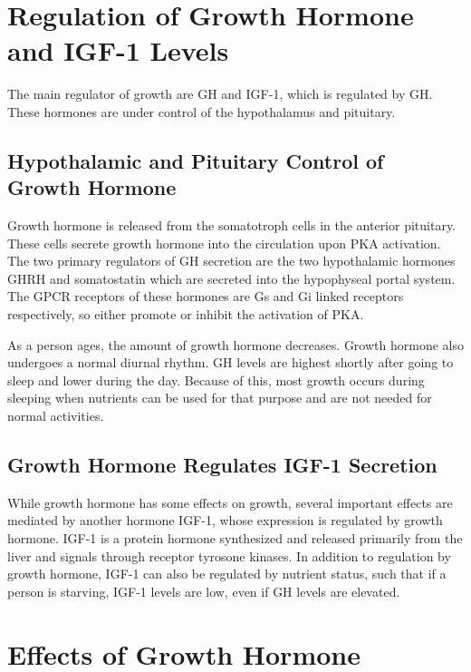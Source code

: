 \documentclass{tufte-handout}
\begin{document}
\section{Regulation of Growth Hormone and IGF-1 Levels}

The main regulator of growth are GH and IGF-1, which is regulated by GH.  These hormones are under control of the hypothalamus and pituitary.

\subsection{Hypothalamic and Pituitary Control of Growth Hormone}

Growth hormone is released from the somatotroph cells in the anterior pituitary.  These cells secrete growth hormone into the circulation upon PKA activation.  The two primary regulators of GH secretion are the two hypothalamic hormones GHRH and somatostatin which are secreted into the hypophyseal portal system.  The GPCR receptors of these hormones are Gs and Gi linked receptors respectively, so either promote or inhibit the activation of PKA.

  As a person ages, the amount of growth hormone decreases.  Growth hormone also undergoes a normal diurnal rhythm.  GH levels are highest shortly after going to sleep and lower during the day.  Because of this, most growth occurs during sleeping when nutrients can be used for that purpose and are not needed for normal activities.

\subsection{Growth Hormone Regulates IGF-1 Secretion}

While growth hormone has some effects on growth, several important effects are mediated by another hormone IGF-1, whose expression is regulated by growth hormone.  IGF-1 is a protein hormone synthesized and released primarily from the liver and signals through receptor tyrosone kinases.  In addition to regulation by growth hormone, IGF-1 can also be regulated by nutrient status, such that if a person is starving, IGF-1 levels are low, even if GH levels are elevated.


\section{Effects of Growth Hormone}
\end{document}
